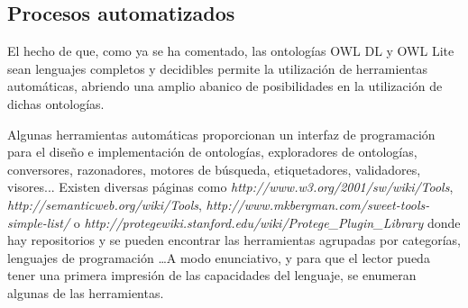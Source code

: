 		
%      
%

	\subsection{Procesos automatizados}
    	El hecho de que, como ya se ha comentado, las ontologías OWL DL y OWL Lite sean lenguajes completos y decidibles permite la utilización de herramientas automáticas, abriendo una amplio abanico de posibilidades en la utilización de dichas ontologías.
    	
    	Algunas herramientas automáticas proporcionan un interfaz de programación para el diseño e implementación de ontologías, exploradores de ontologías, conversores, razonadores, motores de búsqueda, etiquetadores, validadores, visores... Existen diversas páginas como \textit{http://www.w3.org/2001/sw/wiki/Tools}, \textit{http://semanticweb.org/wiki/Tools}, \textit{http://www.mkbergman.com/sweet-tools-simple-list/} o \textit{http://protegewiki.stanford.edu/wiki/Protege\_Plugin\_Library} donde hay repositorios y se pueden encontrar las herramientas agrupadas por categorías, lenguajes de programación \ldots A modo enunciativo, y para que el lector pueda tener una primera impresión de las capacidades del lenguaje, se enumeran algunas de las herramientas.
    	

